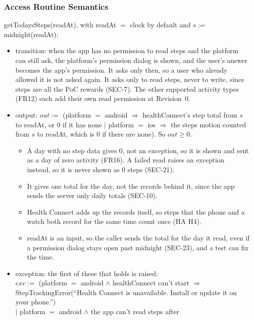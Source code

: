 \documentclass[12pt, titlepage]{article}
\begin{document}
\subsubsection{Access Routine Semantics}

\noindent getTodaysSteps(readAt), with readAt $=$ clock by default and
$s :=$ midnight(readAt):
\begin{itemize}
\item transition: when the app has no permission to read steps and the
  platform can still ask, the platform's permission dialog is shown, and the
  user's answer becomes the app's permission. It asks only then, so a user who
  already allowed it is not asked again. It asks only to read steps, never to
  write, since steps are all the PoC rewards (SEC-7). The other supported
  activity types (FR12) each add their own read permission at Revision~0.
\item output: $out :=$ (platform $=$ android $\Rightarrow$ healthConnect's
  step total from $s$ to readAt, or 0 if it has none $|$
  platform $=$ ios $\Rightarrow$ the steps motion counted from $s$ to readAt,
  which is 0 if there are none). So $out \geq 0$.
  \begin{itemize}
  \item A day with no step data gives 0, not an exception, so it is shown and
    sent as a day of zero activity (FR16). A failed read raises an exception
    instead, so it is never shown as 0 steps (SEC-21).
  \item It gives one total for the day, not the records behind it, since the
    app sends the server only daily totals (SEC-10).
  \item Health Connect adds up the records itself, so steps that the phone and
    a watch both record for the same time count once (HA H4).
  \item readAt is an input, so the caller sends the total for the day it read,
    even if a permission dialog stays open past midnight (SEC-23), and a test
    can fix the time.
  \end{itemize}
\item {\raggedright exception: the first of these that holds is raised:\\
  \hspace*{1em}$exc :=$ (platform $=$ android $\land$ healthConnect can't start
  $\Rightarrow$ StepTrackingError(``Health Connect is unavailable. Install or
  update it on your phone.'')\\
  \hspace*{1em}$|$ platform $=$ android $\land$ the app can't read steps after
}
\end{itemize}
\end{document}
